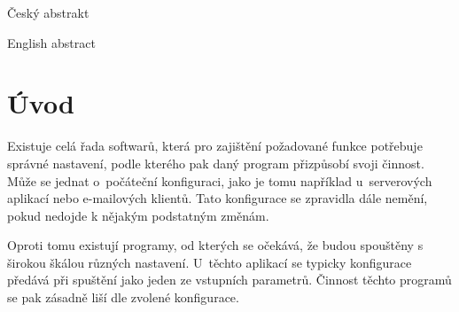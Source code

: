 \documentclass[FM,DP]{tulthesis}
\begin{document}

\begin{abstractCZ}
\thispagestyle{empty}
Český abstrakt
\end{abstractCZ}

\vspace{2cm}
\begin{abstractEN}
English abstract
\end{abstractEN}

\clearpage
\begin{acknowledgement}

\end{acknowledgement}

\tableofcontents
\clearpage

\begin{abbrList}
\end{abbrList}

\chapter*{Úvod}

Existuje celá řada softwarů, která pro zajištění požadované funkce potřebuje správné nastavení, podle kterého pak daný program přizpůsobí svoji činnost. Může se jednat o~počáteční konfiguraci, jako je tomu například u~serverových aplikací nebo e-mailových klientů. Tato konfigurace se zpravidla dále nemění, pokud nedojde k nějakým podstatným změnám.

Oproti tomu existují programy, od kterých se očekává, že budou spouštěny s širokou škálou různých nastavení. U~těchto aplikací se typicky konfigurace předává při spuštění jako jeden ze vstupních parametrů. Činnost těchto programů se pak zásadně liší dle zvolené konfigurace.


\end{document}
